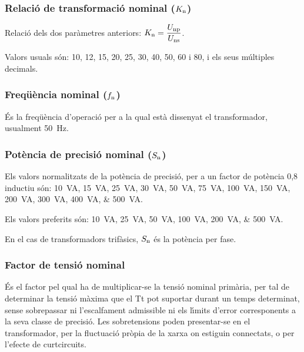 \subsubsection{Relaci\'{o} de transformaci\'{o} nominal ($K_\mathrm{n}$)}

 Relaci\'{o}  dels dos par\`{a}metres anteriors: $K_\mathrm{n} = \dfrac{U_\mathrm{np}}{U_\mathrm{ns}}$.

 Valors usuals s\'{o}n: 10, 12, 15, 20, 25, 30, 40, 50, 60 i 80, i els seus m\'{u}ltiples decimals.

\subsubsection{Freq\"{u}\`{e}ncia nominal ($f_\mathrm{n}$)}

 \'{E}s la freq\"{u}\`{e}ncia d'operaci\'{o} per a la qual  est\`{a} dissenyat el transformador, usualment \SI{50}{Hz}.

\subsubsection{Pot\`{e}ncia de precisi\'{o} nominal ($S_\mathrm{n}$)}

Els valors normalitzats de la pot\`{e}ncia de precisi\'{o}, per
a un factor de pot\`{e}ncia 0,8 inductiu s\'{o}n: \SIlist{10; 15; 25; 30; 50; 75; 100; 150;
 200; 300; 400; 500}{VA}.

 Els valors preferits s\'{o}n: \SIlist{10; 25; 50; 100; 200; 500}{VA}.

En el cas de transformadors trif\`{a}sics, $S_\mathrm{n}$ \'{e}s la pot\`{e}ncia per fase.

\subsubsection{Factor de tensi\'{o} nominal}

 \'{E}s el factor pel qual ha de
multiplicar-se la tensi\'{o} nominal prim\`{a}ria, per tal de determinar la
tensi\'{o} m\`{a}xima que el Tt pot suportar durant un temps determinat,
sense sobrepassar ni l'escalfament admissible ni els l\'{\i}mits d'error
corresponents a la seva classe de precisi\'{o}. Les sobretensions poden
presentar-se en el transformador,  per la fluctuaci\'{o}
pr\`{o}pia de la xarxa on estiguin connectats, o per l'efecte de curtcircuits.

